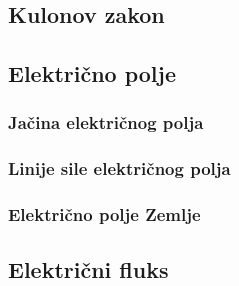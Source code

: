 	
	\subsection{Kulonov zakon}
	
	
	
	\subsection{Električno polje}
	
	
	\subsubsection{Jačina električnog polja}
	
	
	\subsubsection{Linije sile električnog polja}
	
	
	
	\subsubsection{Električno polje Zemlje}
	
	
	
	\subsection{Električni fluks}
